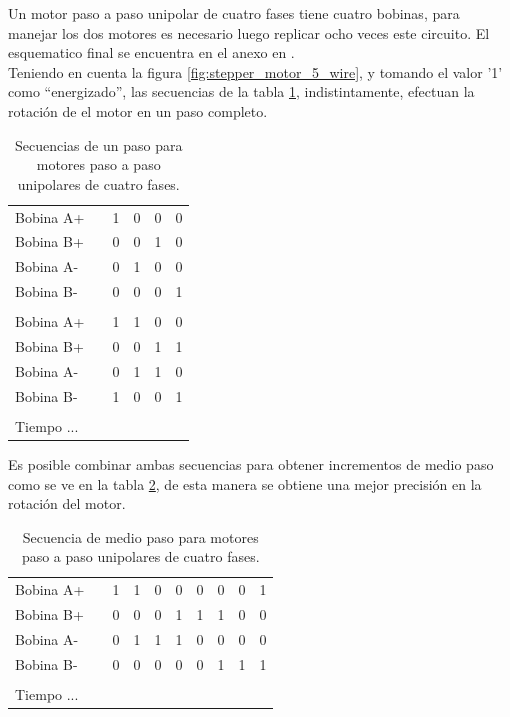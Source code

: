 Un motor paso a paso unipolar de cuatro fases tiene cuatro bobinas, para
manejar los dos motores es necesario luego replicar ocho veces este circuito.
El esquematico final se encuentra en el anexo en .\\

Teniendo en cuenta la figura \ref{fig:stepper_motor_5_wire}, y tomando el
valor '1' como ``energizado'', las secuencias de la tabla
\ref{tab:seq_motors_1}, indistintamente, efectuan la rotaci\'on de el motor en
un paso completo.

\begin{table}[htp]
\centering
\begin{tabular}{l c|c|c|c|c|}
Bobina A+ & & 1 & 0 & 0 & 0 \\	
Bobina B+ & & 0 & 0 & 1 & 0 \\
Bobina A- &	& 0 & 1 & 0 & 0 \\
Bobina B- &	& 0 & 0 & 0 & 1 \\
							\\
Bobina A+ & & 1 & 1 & 0 & 0 \\
Bobina B+ &	& 0 & 0 & 1 & 1 \\
Bobina A- &	& 0 & 1 & 1 & 0 \\ 
Bobina B- &	& 1 & 0 & 0 & 1 \\
							\\
Tiempo	...					\\
\end{tabular}
\caption{Secuencias de un paso para motores paso a paso unipolares de cuatro
fases.}
\label{tab:seq_motors_1}
\end{table}

Es posible combinar ambas secuencias para obtener incrementos de medio paso
como se ve en la tabla \ref{tab:seq_motors_2}, de esta manera se obtiene una
mejor precisi\'on en la rotaci\'on del motor.

\begin{table}[htp]
\centering
\begin{tabular}{l c|c|c|c|c|c|c|c|c|}
Bobina A+ & & 1 & 1 & 0 & 0 & 0 & 0 & 0 & 1\\	
Bobina B+ & & 0 & 0 & 0 & 1 & 1 & 1 & 0 & 0\\
Bobina A- &	& 0 & 1 & 1 & 1 & 0 & 0 & 0 & 0\\
Bobina B- &	& 0 & 0 & 0 & 0 & 0 & 1 & 1 & 1\\
							\\
Tiempo	...					\\
\end{tabular}
\caption{Secuencia de medio paso para motores paso a paso unipolares de cuatro
fases.}
\label{tab:seq_motors_2}
\end{table}

